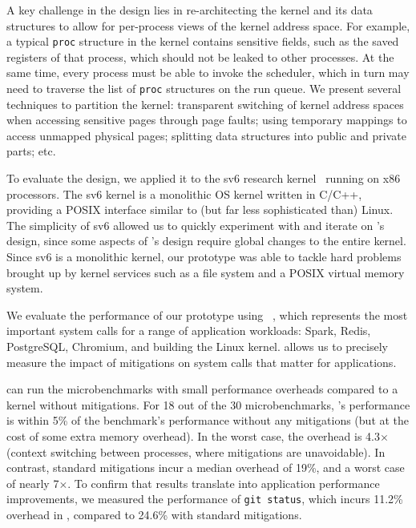 A key challenge in the \sys design lies in re-architecting the kernel
and its data structures to allow for per-process views of the
kernel address space.  For example, a typical \texttt{proc} structure in
the kernel contains sensitive fields, such as the saved registers of that
process, which should not be leaked to other processes.  At the same time,
every process must be able to invoke the scheduler, which in turn may
need to traverse the list of \texttt{proc} structures on the run queue.
We present several techniques to partition the kernel:
transparent switching of kernel address spaces when accessing sensitive
pages through page faults; using temporary mappings to access unmapped
physical pages; splitting data structures into public and private
parts; etc.

To evaluate the \sys design, we applied it to the sv6 research
kernel~\cite{clements:sc} running on x86 processors.  The sv6 kernel
is a monolithic OS kernel written in C/C++, providing a POSIX
interface similar to (but far less sophisticated than) Linux.  The
simplicity of sv6 allowed us to quickly experiment with and iterate on
\sys's design, since some aspects of \sys's design require global
changes to the entire kernel.  Since sv6 is a monolithic kernel,
our prototype was able to tackle hard problems brought up by kernel
services such as a file system and a POSIX virtual memory system.

We evaluate the performance of our \sys prototype using
\bench~\cite{lebench}, which represents the most important system calls
for a range of application workloads: Spark, Redis, PostgreSQL,
Chromium, and building the Linux kernel.  \bench allows us to precisely
measure the impact of mitigations on system calls that matter
for applications.

\sys can run the \bench microbenchmarks with small performance
overheads compared to a kernel without mitigations.  For 18 out of
the 30 \bench microbenchmarks, \sys's performance is within 5\% of the
benchmark's performance without any mitigations (but at the cost of some
extra memory overhead).  In the worst case, the overhead is 4.3$\times$
(context switching between processes, where mitigations are unavoidable).
In contrast, standard mitigations incur a median overhead of 19\%, and
a worst case of nearly 7$\times$.  To confirm that \bench results translate
into application performance improvements, we measured the performance
of \texttt{git status}, which incurs 11.2\% overhead in \sys, compared
to 24.6\% with standard mitigations.

